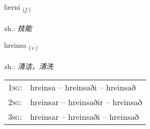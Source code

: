 \documentclass[frontgrid, backgrid]{flacards}\usepackage[]{graphicx}\usepackage[]{xcolor}
\begin{document}
\renewcommand{\flhead}{\vskip5pt \fboxsep=0pt {\small\bfseries\footnotesize Nafnorð | 名词}}
\renewcommand{\fcfoot}{\vskip5pt \fboxsep=0pt \hspace{2pt}{\small\bfseries\footnotesize 3K}}

\renewcommand{\blhead}{\vskip5pt {\small\bfseries\footnotesize Nafnorð | 名词 }}
\renewcommand{\bcfoot}{\vskip5pt \hspace{2pt}{\small\bfseries\footnotesize 3K}}


{færni \small{\textsubscript{(\textit{f.})}} \\[1ex] %
\textphonetic{[fairtnɪ]} \\
zh.: \emph{技能} \\  [2ex]
\renewcommand*{\arraystretch}{0.8}
}

\renewcommand{\flhead}{\vskip5pt \fboxsep=0pt {\small\bfseries\footnotesize Sagnorð | 动词}}
\renewcommand{\fcfoot}{\vskip5pt \fboxsep=0pt \hspace{2pt}{\small\bfseries\footnotesize 3K}}

\renewcommand{\blhead}{\vskip5pt {\small\bfseries\footnotesize Sagnorð | 动词 }}
\renewcommand{\bcfoot}{\vskip5pt \hspace{2pt}{\small\bfseries\footnotesize 3K}}


{hreinsa \small{\textsubscript{(\textit{v.})}} \\[1ex] %
\textphonetic{[r̥einsa]} \\
zh.: \emph{清洁，清洗} \\  [2ex]
\renewcommand*{\arraystretch}{0.8}
\begin{tabular}{p{1cm}l}
\textsc{1sg}: & hreinsa -- hreinsaði -- hreinsað \\ 
\textsc{2sg}: & hreinsar -- hreinsaðir -- hreinsað \\ 
\textsc{3sg}: & hreinsar -- hreinsaði -- hreinsað \\ 
\end{tabular}
}
\end{document}
